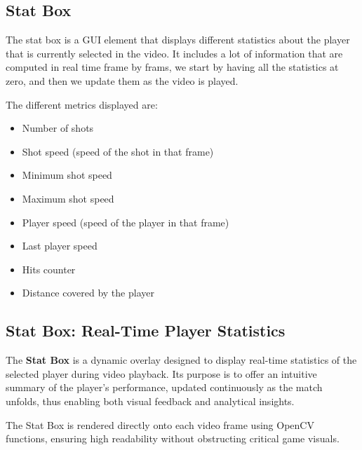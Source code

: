 \subsection{Stat Box}

The stat box is a GUI element that displays different statistics about the player that is currently selected in the video. 
It includes a lot of information that are computed in real time frame by frams, we start by having all the statistics at zero, and then we update them as the video is played.

The different metrics displayed are:
\begin{itemize}
    \item Number of shots
    \item Shot speed (speed of the shot in that frame)
    \item Minimum shot speed
    \item Maximum shot speed
    \item Player speed (speed of the player in that frame)
    \item Last player speed
    \item Hits counter
    \item Distance covered by the player
\end{itemize}


\subsection{Stat Box: Real-Time Player Statistics}

The \textbf{Stat Box} is a dynamic overlay designed to display real-time statistics of the selected player during video playback.  
Its purpose is to offer an intuitive summary of the player's performance, updated continuously as the match unfolds, thus enabling both visual feedback and analytical insights.

The Stat Box is rendered directly onto each video frame using OpenCV functions, ensuring high readability without obstructing critical game visuals.

